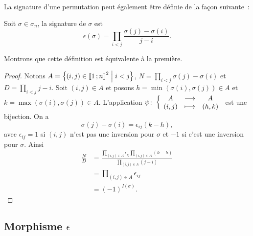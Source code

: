 La signature d'une permutation peut également être définie de la façon suivante~:
\begin{defdef}
  Soit \(\sigma \in \sigma_n\), la signature de \(\sigma\) est
  \begin{equation}
    \epsilon(\sigma)=\prod_{i<j} \frac{\sigma(j)-\sigma(i)}{j-i}.
  \end{equation}
\end{defdef}
Montrons que cette définition est équivalente à la première.
\begin{proof}
  Notons \(A=\left\{(i,j) \in \mathopen{\llbracket}1\mathclose{}\mathpunct{};n\mathclose{\rrbracket}^2\mathrel{}\middle|\mathrel{}i<j\right\}\), \(N=\prod_{i<j}\sigma(j)-\sigma(i)\) et \(D=\prod_{i<j} j-i\). Soit \((i,j) \in A\) et posons \(h=\min(\sigma(i),\sigma(j)) \in A\) et \(k=\max(\sigma(i),\sigma(j))\in A\). L'application \(\psi\colon \left\{\begin{array}{ccc} A & \longrightarrow &A\\ (i,j) & \longmapsto & (h,k) \end{array} \right.\) est une bijection. On a
  \begin{equation}
    \sigma(j)-\sigma(i) = \epsilon_{ij} (k-h),
  \end{equation}
  avec \(\epsilon_{ij}=1\) si \((i,j)\) n'est pas une inversion pour \(\sigma\) et \(-1\) si c'est une inversion pour \(\sigma\). Ainsi
  \begin{align}
    \frac{N}{D} &= \frac{\prod_{(i,j) \in A}\epsilon_{ij}\prod_{(i,j) \in A}(k-h)}{\prod_{(i,j) \in A}(j-i)}\\
    &=\prod_{(i,j) \in A}\epsilon_{ij}\\
    &=(-1)^{I(\sigma)}.  
  \end{align}
\end{proof}

\subsection{Morphisme \(\epsilon\)}

